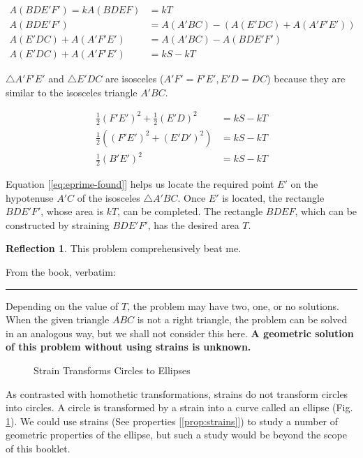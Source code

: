 \documentclass[11pt]{article}
\theoremstyle{definition}
\theoremstyle{plain}
\theoremstyle{problemstyle}
\theoremstyle{remark}
\theoremstyle{definition}
\newtheorem{reflection}{Reflection}
\begin{document}
\begin{equation}
\begin{aligned}
    A(BDE'F')=kA(BDEF)&=k T\\
    A(BDE'F')&=A(A'BC)-(A(E'DC)+A(A'F'E'))\\
    A(E'DC)+A(A'F'E')&=A(A'BC)-A(BDE'F')\\
    A(E'DC)+A(A'F'E')&=kS-kT
\end{aligned}\label{eq:areas-of-tr}
\end{equation}

$\triangle A'F'E'$ and $\triangle E'DC$ are isosceles ($A'F'=F'E', E'D=DC$) because they are similar to the isosceles triangle $A'BC$.

\begin{equation}
\begin{aligned}
    \frac{1}{2}(F'E')^2+\frac{1}{2}(E'D)^2&=kS-kT\\
    \frac{1}{2}((F'E')^2+(E'D')^2)&=kS-kT\\
    \frac{1}{2}(B'E')^2&=kS-kT
\end{aligned}\label{eq:eprime-found}
\end{equation}

Equation [\ref{eq:eprime-found}] helps us locate the required point $E'$ on the hypotenuse $A'C$ of the isosceles $\triangle A'BC$. Once $E'$ is located, the rectangle $BDE'F'$, whose area is $kT$, can be completed. The rectangle $BDEF$, which can be constructed by straining $BDE'F'$, has the desired area $T$.

\begin{reflection}
    This problem comprehensively beat me.
\end{reflection}

From the book, verbatim:

\noindent\rule{\linewidth}{0.4pt}

Depending on the value of $T$, the problem may have two, one, or no solutions. When the given triangle $ABC$ is not a right triangle, the problem can be solved in an analogous way, but we shall not consider this here. \textbf{A geometric solution of this problem without using strains is unknown.} 

\begin{figure}[H]
  \centering
{}
  \caption{Strain Transforms Circles to Ellipses}
  \label{fig:strain-circle-ellipse}
\end{figure}
As contrasted with homothetic transformations, strains do not transform circles into circles. A circle is transformed by a strain into a curve called an ellipse (Fig. \ref{fig:strain-circle-ellipse}). We could use strains (See properties [\ref{prop:strains}]) to study a number of geometric properties of the ellipse, but such a study would be beyond the scope of this booklet.
\end{document}
